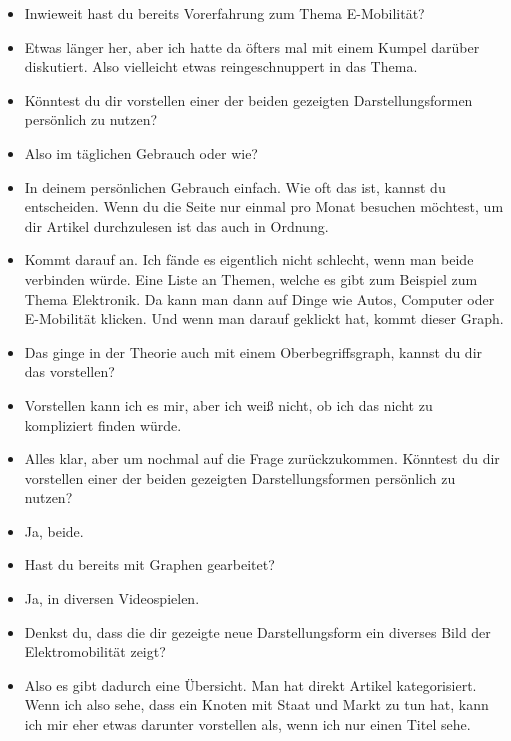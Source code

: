 {\begin{itemize}[]
            \item {} Inwieweit hast du bereits Vorerfahrung zum Thema E-Mobilität?
            \item {} Etwas länger her, aber ich hatte da öfters mal mit einem Kumpel darüber diskutiert.
                  Also vielleicht etwas reingeschnuppert in das Thema.
            \item {} Könntest du dir vorstellen einer der beiden gezeigten Darstellungsformen persönlich zu nutzen?
            \item {} Also im täglichen Gebrauch oder wie?
            \item {} In deinem persönlichen Gebrauch einfach.
                  Wie oft das ist, kannst du entscheiden.
                  Wenn du die Seite nur einmal pro Monat besuchen möchtest, um dir Artikel durchzulesen ist das auch in Ordnung.
            \item {} Kommt darauf an. Ich fände es eigentlich nicht schlecht, wenn man beide verbinden würde.
                  Eine Liste an Themen, welche es gibt zum Beispiel zum Thema Elektronik.
                  Da kann man dann auf Dinge wie Autos, Computer oder E-Mobilität klicken.
                  Und wenn man darauf geklickt hat, kommt dieser Graph.
            \item {} Das ginge in der Theorie auch mit einem Oberbegriffsgraph, kannst du dir das vorstellen?
            \item {} Vorstellen kann ich es mir, aber ich weiß nicht, ob ich das nicht zu kompliziert finden würde.
            \item {} Alles klar, aber um nochmal auf die Frage zurückzukommen.
                  Könntest du dir vorstellen einer der beiden gezeigten Darstellungsformen persönlich zu nutzen?
            \item {} Ja, beide.
            \item {} Hast du bereits mit Graphen gearbeitet?
            \item {} Ja, in diversen Videospielen.
            \item {} Denkst du, dass die dir gezeigte neue Darstellungsform ein diverses Bild der Elektromobilität zeigt?
            \item {} Also es gibt dadurch eine Übersicht.
                  Man hat direkt Artikel kategorisiert.
                  Wenn ich also sehe, dass ein Knoten mit Staat und Markt zu tun hat, kann ich mir eher etwas darunter vorstellen als, wenn ich nur einen Titel sehe.

\end{itemize}}

